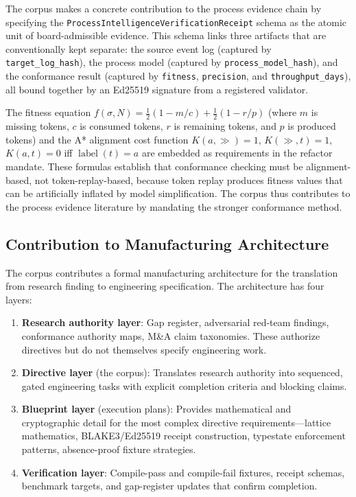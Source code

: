 The corpus makes a concrete contribution to the process evidence chain by specifying
the \texttt{ProcessIntelligenceVerificationReceipt} schema as the atomic unit of
board-admissible evidence. This schema links three artifacts that are conventionally
kept separate: the source event log (captured by \texttt{target\_log\_hash}), the
process model (captured by \texttt{process\_model\_hash}), and the conformance result
(captured by \texttt{fitness}, \texttt{precision}, and \texttt{throughput\_days}),
all bound together by an Ed25519 signature from a registered validator.

The fitness equation $f(\sigma, N) = \frac{1}{2}(1 - m/c) + \frac{1}{2}(1 - r/p)$
(where $m$ is missing tokens, $c$ is consumed tokens, $r$ is remaining tokens, and
$p$ is produced tokens) and the A* alignment cost function $K(a, \gg) = 1$,
$K(\gg, t) = 1$, $K(a, t) = 0$ iff $\operatorname{label}(t) = a$ are embedded as
requirements in the refactor mandate. These formulas establish that conformance
checking must be alignment-based, not token-replay-based, because token replay
produces fitness values that can be artificially inflated by model simplification.
The corpus thus contributes to the process evidence literature by mandating the
stronger conformance method.

\subsection{Contribution to Manufacturing Architecture}
\label{sec:prompts-contribution-manufacturing}

The corpus contributes a formal manufacturing architecture for the translation from
research finding to engineering specification. The architecture has four layers:

\begin{enumerate}
  \item \textbf{Research authority layer}: Gap register, adversarial red-team
    findings, conformance authority maps, M\&A claim taxonomies. These authorize
    directives but do not themselves specify engineering work.
  \item \textbf{Directive layer} (the corpus): Translates research authority into
    sequenced, gated engineering tasks with explicit completion criteria and blocking
    claims.
  \item \textbf{Blueprint layer} (execution plans): Provides mathematical and
    cryptographic detail for the most complex directive requirements---lattice
    mathematics, BLAKE3/Ed25519 receipt construction, typestate enforcement patterns,
    absence-proof fixture strategies.
  \item \textbf{Verification layer}: Compile-pass and compile-fail fixtures, receipt
    schemas, benchmark targets, and gap-register updates that confirm completion.
\end{enumerate}

